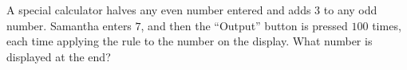 A special calculator halves any even number entered and adds $3$ to any odd number. Samantha enters $7$, and then the ``Output'' button is pressed $100$ times, each time applying the rule to the number on the display. What number is displayed at the end?
